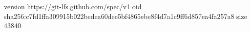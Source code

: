 version https://git-lfs.github.com/spec/v1
oid sha256:c7fd1ffa309915b022bedea60dee5bf4865ebe8f4d7a1c9ff6d857ea4fa257a8
size 43840

